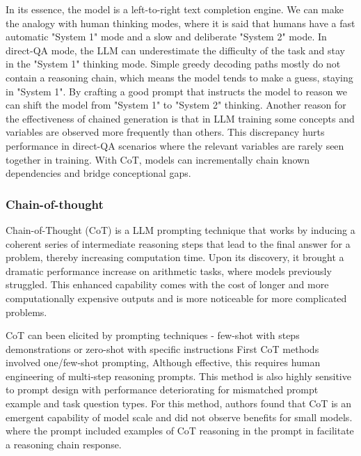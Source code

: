 In its essence, the model is a left-to-right text completion engine. We can make the analogy with human thinking 
modes, where it is said that humans have a fast automatic "System 1" mode and a slow and deliberate "System 2" mode\cite{yao2023treethoughtsdeliberateproblem}. 
In direct-QA mode, the LLM can underestimate the difficulty of the task\cite{wang2024chainofthoughtreasoningprompting} and stay in the "System 1" thinking mode.
Simple greedy decoding paths mostly do not contain a reasoning chain\cite{wang2024chainofthoughtreasoningprompting}, which means the model tends to make a guess, staying in "System 1".
By crafting a good prompt that instructs the model to reason we can shift the model from "System 1" to "System 2" thinking.
Another reason for the effectiveness of chained generation is that in LLM training
some concepts and variables are observed more frequently than others\cite{prystawski2023thinkstepstepreasoning}. 
This discrepancy hurts performance in direct-QA scenarios where the relevant
variables are rarely seen together in training. With CoT, models can incrementally chain known dependencies and bridge conceptional gaps.

\subsubsection{Chain-of-thought}\label{sec:cot}
Chain-of-Thought\cite{wei2023chainofthoughtpromptingelicitsreasoning} (CoT) is a LLM prompting technique that works by inducing a coherent series of intermediate 
reasoning steps that lead to the final answer for a problem, thereby increasing computation time. 
Upon its discovery, it brought a dramatic performance increase on arithmetic tasks, where models previously struggled.
This enhanced capability comes with the cost of longer and more computationally expensive outputs\cite{brown2024largelanguagemonkeysscaling} and
is more noticeable for more complicated problems\cite{wei2023chainofthoughtpromptingelicitsreasoning}. 

CoT can been elicited by prompting techniques - few-shot with steps demonstrations or 
zero-shot with specific instructions\cite{wang2024chainofthoughtreasoningprompting}
First CoT methods\cite{wei2023chainofthoughtpromptingelicitsreasoning} involved one/few-shot prompting, 
Although effective, this requires human engineering of multi-step reasoning prompts.
This method is also highly sensitive to prompt design with performance deteriorating 
for mismatched prompt example and task question types\cite{NEURIPS2022_8bb0d291}.
For this method, authors found that CoT is an emergent capability of model scale 
and did not observe benefits for small models\cite{wei2023chainofthoughtpromptingelicitsreasoning}.
where the prompt included examples of CoT reasoning in the prompt in facilitate a reasoning chain response.

